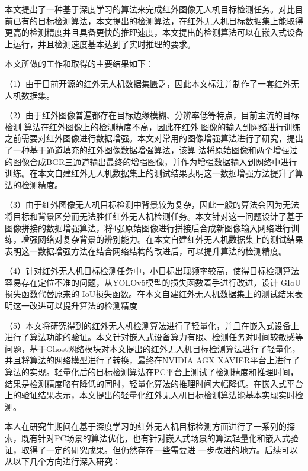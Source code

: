 \begin{conclusions}

本文提出了一种基于深度学习的算法来完成红外图像无人机目标检测任务。对比目前已有的目标检测算法，本文提出的检测算法，在红外无人机目标数据集上能取得更高的检测精度并且具备更快的推理速度，本文提出的检测算法可以在嵌入式设备上运行，并且检测速度基本达到了实时推理的要求。

本文所做的工作和取得的主要结果如下：

（1）由于目前开源的红外无人机数据集匮乏，因此本文标注并制作了一套红外无人机数据集。

（2）由于红外图像普遍都存在目标边缘模糊、分辨率低等特点，目前主流的目标检测
算法在红外图像上的检测精度不高，因此在红外
图像的输入到网络进行训练之前需要对红外图像进行数据增强。本文对常用的图像增强算法进行了研究，提出了一种基于通道填充的红外图像数据增强算法，该算
法将原始图像和两个增强过的图像合成BGR三通道输出最终的增强图像，并作为增强数据输入到网络中进行训练。在本文自建红外无人机数据集上的测试结果表明这一数据增强方法提升了算法的检测精度。

（3）由于红外图像无人机目标检测中背景较为复杂，因此一般的算法会因为无法将目标和背景区分而无法胜任红外无人机检测任务。本文针对这一问题设计了基于图像拼接的数据增强算法，将4张原始图像进行拼接后合成新图像输入网络进行训练，增强网络对复杂背景的辨别能力。在本文自建红外无人机数据集上的测试结果表明这一数据增强方法在结合网络结构的改进后，可以提升算法的检测精度。

（4）针对红外无人机目标检测任务中，小目标出现频率较高，使得目标检测算法容易存在定位不准的问题，从YOLOv5模型的损失函数着手进行改进，设计 GIoU 损失函数代替原来的
IoU损失函数。在本文自建红外无人机数据集上的测试结果表明这一改进可以提升算法的检测精度


（5）本文将研究得到的红外无人机检测算法进行了轻量化，并且在嵌入式设备上进行了算法功能的验证。本文针对嵌入式设备算力有限、检测任务对时间较敏感等问题，基于Ghost网络模块对本文提出的红外无人机目标检测算法进行了轻量化，并且将算法的网络模型进行了转换，最终在NVIDIA AGX XAVIER平台上进行了算法的实现。轻量化后的目标检测算法在PC平台上测试了检测精度和推理时间，结果是检测精度略有降低的同时，轻量化算法的推理时间大幅降低。在嵌入式平台上的验证结果表示，本文提出的轻量化红外无人机目标检测算法能基本实现实时检测。

本人在研究生期间在基于深度学习的红外无人机目标检测方面进行了一系列的探
索，既有针对PC场景的算法优化，也有针对嵌入式场景的算法轻量化和嵌入式验证，取得了一定的研究成果。但仍然存在一些需要进
一步改进的地方。后续可以从以下几个方向进行深入研究：


\end{conclusions}
